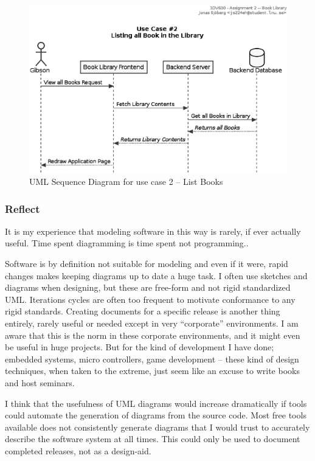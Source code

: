\begin{figure}[htbp]
  \centering
  \includegraphics[width=0.75\linewidth]{include/uml-use-case-2-seq.eps}
  \caption{UML Sequence Diagram for use case 2 -- List Books}
  \label{fig:uml-usecase2seq}
\end{figure}


\subsubsection{Reflect}\label{task-1a-reflect}
It is my experience that modeling software in this way is rarely, if ever
actually useful. Time spent diagramming is time spent not programming..

Software is by definition not suitable for modeling and even if it were, rapid
changes makes keeping diagrams up to date a huge task.  I often use sketches
and diagrams when designing, but these are free-form and not rigid standardized
UML. Iterations cycles are often too frequent to motivate conformance to any
rigid standards. Creating documents for a specific release is another thing
entirely, rarely useful or needed except in very ``corporate'' environments.  I
am aware that this is the norm in these corporate environments, and it might
even be useful in huge projects.  But for the kind of development I have done;
embedded systems, micro controllers, game development -- these kind of design
techniques, when taken to the extreme, just seem like an excuse to write books
and host seminars. \cite{use-case-critiques} \cite{use-case-critique}

I think that the usefulness of UML diagrams would increase dramatically if
tools could automate the generation of diagrams from the source code.  Most
free tools available does not consistently generate diagrams that I would trust
to accurately describe the software system at all times. This could only be
used to document completed releases, not as a design-aid.


